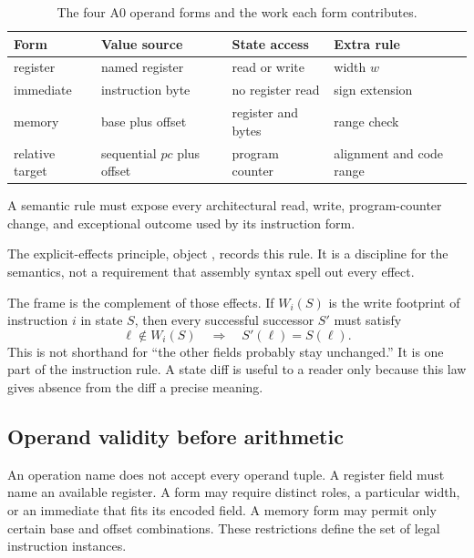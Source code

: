 \begin{table}
\centering
\caption{The four A0 operand forms and the work each form contributes.}
\begin{tabular}{p{}p{}p{}p{}}
\toprule
Form & Value source & State access & Extra rule \\
\midrule
register & named register & read or write & width \(w\) \\
immediate & instruction byte & no register read & sign extension \\
memory & base plus offset & register and bytes & range check \\
relative target & sequential \(pc\) plus offset & program counter & alignment and code range \\
\bottomrule
\end{tabular}
\end{table}

\begin{keyidea}[title={Explicit effects}]
A semantic rule must expose every architectural read, write, program-counter
change, and exceptional outcome used by its instruction form.
\end{keyidea}

The explicit-effects principle, object
, records this rule. It is a discipline
for the semantics, not a requirement that assembly syntax spell out every
effect.

The frame is the complement of those effects. If \(W_i(S)\) is the write
footprint of instruction \(i\) in state \(S\), then every successful
successor \(S'\) must satisfy
\[
 \ell\notin W_i(S)\quad\Longrightarrow\quad S'(\ell)=S(\ell).
\]
This is not shorthand for ``the other fields probably stay unchanged.'' It is
one part of the instruction rule. A state diff is useful to a reader only
because this law gives absence from the diff a precise meaning.

\subsection{Operand validity before arithmetic}

An operation name does not accept every operand tuple. A register field must
name an available register. A form may require distinct roles, a particular
width, or an immediate that fits its encoded field. A memory form may permit
only certain base and offset combinations. These restrictions define the
set of legal instruction instances.

